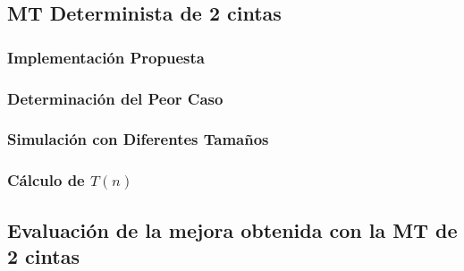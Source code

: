 \documentclass{uc3mpracticas}
\begin{document}
  \subsection{MT Determinista de 2 cintas}

  \subsubsection{Implementación Propuesta}

  \subsubsection{Determinación del Peor Caso}

  \subsubsection{Simulación con Diferentes Tamaños}

  \subsubsection{Cálculo de $T(n)$}



  \subsection{Evaluación de la mejora obtenida con la MT de 2 cintas}
\end{document}
